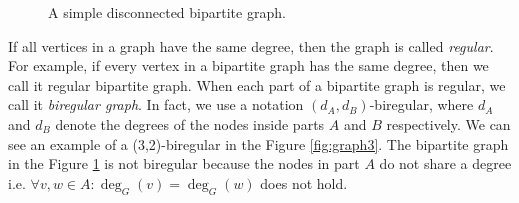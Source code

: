 \begin{figure}[H]
\centering
\caption{A simple disconnected bipartite graph.\label{fig:graph2}}
\end{figure}

If all vertices in a graph have the same degree, then the graph is called \emph{regular}.
For example, if every vertex in a bipartite graph has the same degree, then we call it regular bipartite graph. When each part of a bipartite graph is regular, we call it \emph{biregular graph}.
In fact, we use a notation $(d_A,d_B)$-biregular, where $d_A$ and $d_B$ denote the degrees of the nodes inside parts $A$ and $B$ respectively.
We can see an example of a (3,2)-biregular in the Figure \ref{fig:graph3}.
The bipartite graph in the Figure \ref{fig:graph2} is not biregular because the nodes in part $A$ do not share a degree i.e. $\forall v, w \in A: \deg_G(v) = \deg_G(w)$ does not hold.

